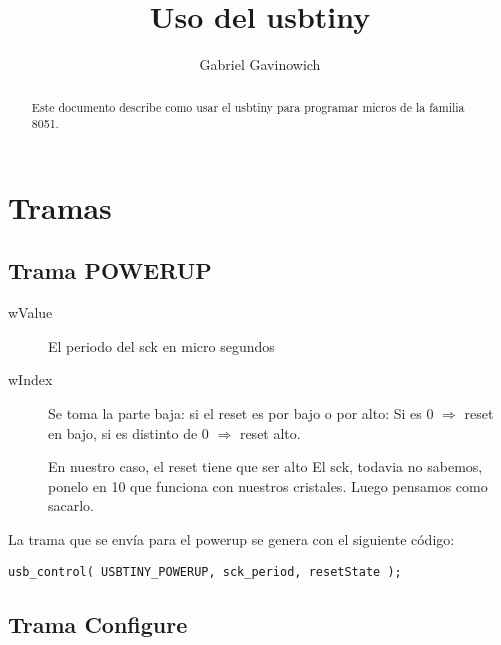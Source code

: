 \documentclass[a4paper,10pt]{article}
\title{Uso del usbtiny}
\author{Gabriel Gavinowich}
\begin{document}
\maketitle
\tableofcontents

\begin{abstract}
Este documento describe como usar el usbtiny para programar micros de la
familia 8051.
\end{abstract}

\section{Tramas}

\subsection*{Trama POWERUP}
\label{sec:powerup}
\begin{description}
 \item[wValue] El periodo del sck en micro segundos
\item [wIndex] Se toma la parte baja:  si el reset es por bajo o por alto:  Si 
es $0$ $\Rightarrow$ reset en bajo, si es distinto de $0$ $\Rightarrow$ reset
alto.

En nuestro caso, el reset tiene que ser alto El sck, todavia no sabemos, ponelo
en 10 que funciona con nuestros cristales. Luego pensamos como sacarlo.
\end{description}

La trama que se envía para el powerup se genera con el siguiente código:
\begin{verbatim}
usb_control( USBTINY_POWERUP, sck_period, resetState );
\end{verbatim} 

\subsection*{Trama Configure}
\end{document}
